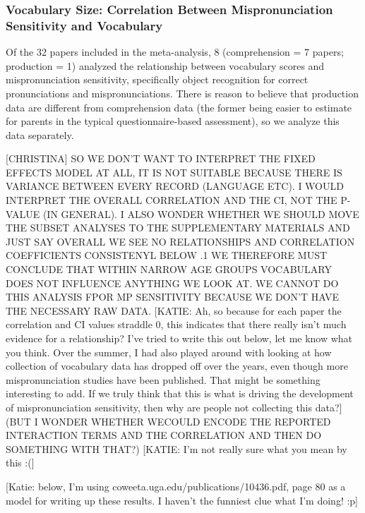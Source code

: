 \documentclass[man]{apa6}
\theoremstyle{definition}
\theoremstyle{definition}
\theoremstyle{definition}
\theoremstyle{remark}
\begin{document}
\subsubsection{Vocabulary Size: Correlation Between Mispronunciation
Sensitivity and
Vocabulary}\label{vocabulary-size-correlation-between-mispronunciation-sensitivity-and-vocabulary}

Of the 32 papers included in the meta-analysis, 8 (comprehension = 7
papers; production = 1) analyzed the relationship between vocabulary
scores and mispronunciation sensitivity, specifically object recognition
for correct pronunciations and mispronunciations. There is reason to
believe that production data are different from comprehension data (the
former being easier to estimate for parents in the typical
questionnaire-based assessment), so we analyze this data separately.

{[}CHRISTINA{]} SO WE DON'T WANT TO INTERPRET THE FIXED EFFECTS MODEL AT
ALL, IT IS NOT SUITABLE BECAUSE THERE IS VARIANCE BETWEEN EVERY RECORD
(LANGUAGE ETC). I WOULD INTERPRET THE OVERALL CORRELATION AND THE CI,
NOT THE P-VALUE (IN GENERAL). I ALSO WONDER WHETHER WE SHOULD MOVE THE
SUBSET ANALYSES TO THE SUPPLEMENTARY MATERIALS AND JUST SAY OVERALL WE
SEE NO RELATIONSHIPS AND CORRELATION COEFFICIENTS CONSISTENYL BELOW .1
WE THEREFORE MUST CONCLUDE THAT WITHIN NARROW AGE GROUPS VOCABULARY DOES
NOT INFLUENCE ANYTHING WE LOOK AT. WE CANNOT DO THIS ANALYSIS FPOR MP
SENSITIVITY BECAUSE WE DON'T HAVE THE NECESSARY RAW DATA. {[}KATIE: Ah,
so because for each paper the correlation and CI values straddle 0, this
indicates that there really isn't much evidence for a relationship? I've
tried to write this out below, let me know what you think. Over the
summer, I had also played around with looking at how collection of
vocabulary data has dropped off over the years, even though more
mispronunciation studies have been published. That might be something
interesting to add. If we truly think that this is what is driving the
development of mispronunciation sensitivity, then why are people not
collecting this data?{]} (BUT I WONDER WHETHER WECOULD ENCODE THE
REPORTED INTERACTION TERMS AND THE CORRELATION AND THEN DO SOMETHING
WITH THAT?) {[}KATIE: I'm not really sure what you mean by this :({]}

{[}Katie: below, I'm using coweeta.uga.edu/publications/10436.pdf, page
80 as a model for writing up these results. I haven't the funniest clue
what I'm doing! :p{]}
\end{document}
